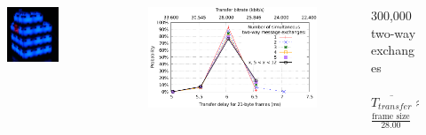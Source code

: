 \begin{frame}
\vspace*{-0.75cm}
\begin{center}
	\begin{columns}[c]
		\begin{column}{.22\textwidth}
			\begin{figure}
				\centering
				\includegraphics[width=0.75\linewidth]{fig/synchronization/dense}
				\label{fig:system}
			\end{figure}
		\end{column}
		\begin{column}{.53\textwidth}
			\begin{figure}
				\centering
				\includegraphics[width=\linewidth]{fig/synchronization/delayNeighborhood}
				\label{fig:transfer-measures}
			\end{figure}
		\end{column}
		\begin{column}{.25\textwidth}	
			300,000 two-way exchanges\\
				~\\$\overline{T_{transfer}} \approx$\\
				 \hspace{1cm} $\frac{\text{frame size}}{28.00}$
		\end{column}
	\end{columns}
	
\end{center}
\end{frame}

